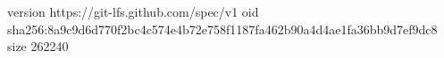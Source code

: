 version https://git-lfs.github.com/spec/v1
oid sha256:8a9c9d6d770f2bc4c574e4b72e758f1187fa462b90a4d4ae1fa36bb9d7ef9dc8
size 262240

